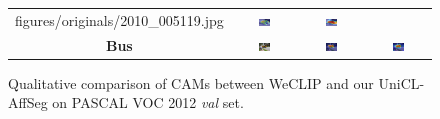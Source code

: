 \begin{figure}[ht]
\begin{tcolorbox}[colframe=black!60, colback=white, boxrule=0.8pt, arc=2pt, left=2pt, right=2pt, top=2pt, bottom=2pt]
\begin{tabular}{c c c c}
      {figures/originals/2010_005119.jpg}
       & \includegraphics[width=0.20\textwidth,height=0.20\textwidth]
      {figures/val_cams/weclip/2010_005119_6.jpg}
       & \includegraphics[width=0.20\textwidth,height=0.20\textwidth]
      {figures/val_cams/ours/2010_005119_6.jpg}
      \\
      \textbf{Bus}
       & \includegraphics[width=0.20\textwidth,height=0.20\textwidth]
      {figures/originals/2010_000148.jpg}
       & \includegraphics[width=0.20\textwidth,height=0.20\textwidth]
      {figures/val_cams/weclip/2010_000148_5.jpg}
       & \includegraphics[width=0.20\textwidth,height=0.20\textwidth]
      {figures/val_cams/ours/2010_000148_5.jpg}
      \\
    \end{tabular}
  \end{tcolorbox}

  \caption{Qualitative comparison of CAMs between WeCLIP and our UniCL-AffSeg on PASCAL VOC 2012 \textit{val} set.}
  \label{fig:qualitative_comparison_cam_val}
\end{figure}


